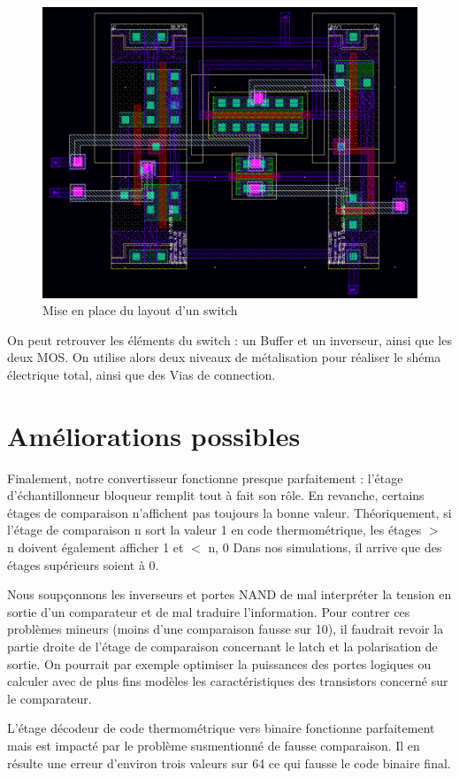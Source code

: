 \documentclass[11pt]{article}
\begin{document}
\begin{figure}[!htb]
      \centering
      \includegraphics[width=0.6\linewidth]{layout_.png}
      \caption{Mise en place du layout d'un switch}
\end{figure}%

On peut retrouver les \'el\'ements du switch : un Buffer et un inverseur, ainsi que les deux MOS. On utilise alors deux niveaux de m\'etalisation pour r\'ealiser le sh\'ema \'electrique total, ainsi que des Vias de connection.

\clearpage

\section{Am\'eliorations possibles}

Finalement, notre convertisseur fonctionne presque parfaitement : l'\'etage d'\'echantillonneur bloqueur remplit tout \`a fait son r\^ole.
En revanche, certains \'etages de comparaison n'affichent pas toujours la bonne valeur. Th\'eoriquement, si l'\'etage de comparaison n sort
la valeur 1 en code thermom\'etrique, les \'etages $>$ n doivent \'egalement afficher 1 et $<$ n, 0 Dans nos simulations, il arrive que des \'etages
sup\'erieurs soient \`a 0.

Nous soup\c connons les inverseurs et portes NAND de mal interpr\'eter la tension en sortie d'un comparateur et de mal traduire l'information.
Pour contrer ces probl\`emes mineurs (moins d'une comparaison fausse sur 10), il faudrait revoir la partie droite de l'\'etage de comparaison
concernant le latch et la polarisation de sortie. On pourrait par exemple optimiser la puissances des portes logiques ou calculer avec de
plus fins mod\`eles les caract\'eristiques des transistors concern\'e sur le comparateur.

L'\'etage d\'ecodeur de code thermom\'etrique vers binaire fonctionne parfaitement mais est impact\'e par le probl\`eme susmentionn\'e de fausse comparaison.
Il en r\'esulte une erreur d'environ trois valeurs sur 64 ce qui fausse le code binaire final.
\end{document}
